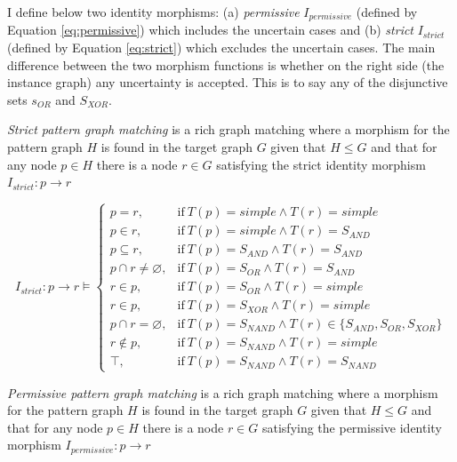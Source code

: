 I define below two identity morphisms: (a) \textit{permissive} $I_{permissive}$ (defined by Equation \ref{eq:permissive}) which includes the uncertain cases and (b) \textit{strict} $I_{strict}$ (defined by Equation \ref{eq:strict}) which excludes the uncertain cases. The main difference between the two morphism functions is whether on the right side (the instance graph) any uncertainty is accepted. This is to say any of the disjunctive sets $s_{OR}$ and $S_{XOR}$. 

\begin{definition}\label{def:strict-matching}
	\textit{Strict pattern graph matching} is a rich graph matching where a morphism for the pattern graph $H$ is found in the target graph $G$ given that $H \leq G$ and that for any node $p \in H$ there is a node $r \in G$ satisfying the strict identity morphism $I_{strict}:p \rightarrow r$
\end{definition}


\begin{equation} \label{eq:strict}
	I_{strict}:p \rightarrow r \models
	\begin{cases}
	p = r, & \text{if}\ T(p) = simple \wedge T(r) = simple \\
	p \in r, & \text{if}\ T(p) = simple \wedge T(r) = S_{AND} \\
	p \subseteq r, & \text{if}\ T(p) = S_{AND} \wedge T(r)= S_{AND} \\
	p \cap r \neq \varnothing, & \text{if}\ T(p) = S_{OR} \wedge T(r) = S_{AND}\\
	r \in p, & \text{if}\ T(p) = S_{OR} \wedge T(r) = simple \\
	r \in p, & \text{if}\ T(p) = S_{XOR} \wedge T(r) = simple \\
	p \cap r = \varnothing, & \text{if}\ T(p) = S_{NAND} \wedge T(r) \in \{S_{AND}, S_{OR}, S_{XOR}\} \\
	r \notin p, & \text{if}\ T(p) = S_{NAND} \wedge T(r) = simple \\
	\top, & \text{if}\ T(p) = S_{NAND} \wedge T(r) = S_{NAND}
	\end{cases}
\end{equation}

\begin{definition}\label{def:permissive-matching}
	\textit{Permissive pattern graph matching} is a rich graph matching where a morphism for the pattern graph $H$ is found in the target graph $G$ given that $H \leq G$ and that for any node $p \in H$ there is a node $r \in G$ satisfying the permissive identity morphism $I_{permissive}:p \rightarrow r$
\end{definition}

